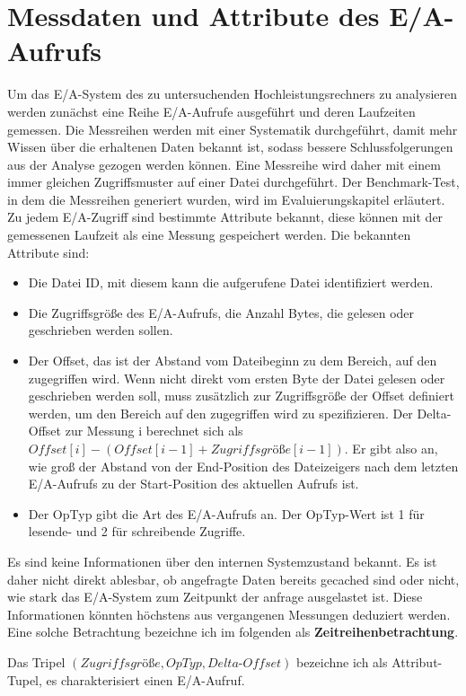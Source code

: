 \documentclass[
	12pt,
	a4paper,
	BCOR10mm,
	DIV14,
	listof=totoc,
	bibliography=totoc,
	headsepline
]{scrreprt}
\begin{document}
\section{Messdaten und Attribute des E/A-Aufrufs}
Um das E/A-System des zu untersuchenden Hochleistungsrechners zu analysieren werden zunächst eine Reihe E/A-Aufrufe ausgeführt und deren Laufzeiten gemessen. Die Messreihen werden mit einer Systematik durchgeführt, damit mehr Wissen über die erhaltenen Daten bekannt ist, sodass bessere Schlussfolgerungen aus der Analyse gezogen werden können.
Eine Messreihe wird daher mit einem immer gleichen Zugriffsmuster auf einer Datei durchgeführt.
Der Benchmark-Test, in dem die Messreihen generiert wurden, wird im Evaluierungskapitel erläutert.
Zu jedem E/A-Zugriff sind bestimmte Attribute bekannt, diese können mit der gemessenen Laufzeit als eine Messung gespeichert werden.
Die bekannten Attribute sind:
\begin{itemize}
	\item Die Datei ID, mit diesem kann die aufgerufene Datei identifiziert werden.
	\item Die Zugriffsgröße des E/A-Aufrufs, die Anzahl Bytes, die gelesen oder geschrieben werden sollen. 
	\item Der Offset, das ist der Abstand vom Dateibeginn zu dem Bereich, auf den zugegriffen wird. Wenn nicht direkt vom ersten Byte der Datei gelesen oder geschrieben werden soll, muss zusätzlich zur Zugriffsgröße der Offset definiert werden, um den Bereich auf den zugegriffen wird zu spezifizieren.
	Der Delta-Offset zur Messung i berechnet sich als $Offset[i] - (Offset[i-1] + Zugriffsgrö\text{ß}e[i-1])$. Er gibt also an, wie groß der Abstand von der End-Position des Dateizeigers nach dem letzten E/A-Aufrufs zu der Start-Position des aktuellen Aufrufs ist.
	\item Der OpTyp gibt die Art des E/A-Aufrufs an. Der OpTyp-Wert ist 1 für lesende- und 2 für schreibende Zugriffe.
\end{itemize}
Es sind keine Informationen über den internen Systemzustand bekannt. Es ist daher nicht direkt ablesbar, ob angefragte Daten bereits gecached sind oder nicht, wie stark das E/A-System zum Zeitpunkt der anfrage ausgelastet ist.
Diese Informationen könnten höchstens aus vergangenen Messungen deduziert werden. Eine solche Betrachtung bezeichne ich im folgenden als \textbf{Zeitreihenbetrachtung}.

Das Tripel $(Zugriffsgrö\text{ß}e,OpTyp,Delta\text{-}Offset)$ bezeichne ich als Attribut-Tupel, es charakterisiert einen E/A-Aufruf.
\end{document}
